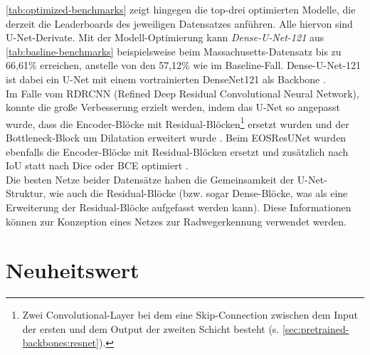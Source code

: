 \autoref{tab:optimized-benchmarks} zeigt hingegen die top-drei optimierten Modelle, die derzeit die Leaderboards 
des jeweiligen Datensatzes anführen. Alle hiervon sind U-Net-Derivate.
Mit der Modell-Optimierung kann \textit{Dense-U-Net-121} aus \autoref{tab:basline-benchmarks} beispielsweise beim Massachusetts-Datensatz 
bis zu 66,61\% erreichen, anstelle von den 57,12\% wie im Baseline-Fall. 
Dense-U-Net-121 ist dabei ein U-Net mit einem vortrainierten DenseNet121 als Backbone \cite{C.Henry.2021}. \\
Im Falle vom RDRCNN (Refined Deep Residual Convolutional Neural Network), konnte die große Verbesserung erzielt werden,
indem das U-Net so angepasst wurde, dass die Encoder-Blöcke mit Residual-Blöcken\footnote{Zwei Convolutional-Layer bei dem eine Skip-Connection zwischen dem Input der ersten und dem Output der zweiten Schicht besteht (s. \autoref{sec:pretrained-backbones:resnet}).} 
ersetzt wurden und der Bottleneck-Block
um Dilatation erweitert wurde \cite{Gao.2019}. 
Beim EOSResUNet wurden ebenfalls die Encoder-Blöcke mit Residual-Blöcken ersetzt und zusätzlich nach \ac{IoU} statt nach Dice oder \ac{BCE} optimiert \cite{O.Filin.2018}. \\
Die besten Netze beider Datensätze haben die Gemeinsamkeit der U-Net-Struktur, wie auch die Residual-Blöcke (bzw.
sogar Dense-Blöcke, was als eine Erweiterung der Residual-Blöcke aufgefasst werden kann). 
Diese Informationen können zur Konzeption eines Netzes zur Radwegerkennung verwendet werden.  

\section{Neuheitswert} \label{sec:novelty}

